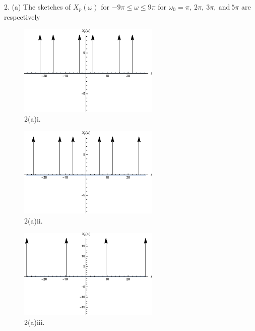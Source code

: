 \documentclass[a4paper]{article}
\begin{document}
2. (a) The sketches of $X_p(\omega)$ for $-9\pi\leq\omega\leq9\pi$ for $\omega_0=\pi,\ 2\pi,\ 3\pi,\ \text{and}\ 5\pi$ are respectively
\begin{figure}[H]
    \begin{center}
        \includegraphics[width=0.6\textwidth]{2(a)i.eps}
    \end{center}
    \caption{2(a)i.}
\end{figure}
\begin{figure}[H]
    \begin{center}
        \includegraphics[width=0.6\textwidth]{2(a)ii.eps}
    \end{center}
    \caption{2(a)ii.}
\end{figure}
\begin{figure}[H]
    \begin{center}
        \includegraphics[width=0.6\textwidth]{2(a)iii.eps}
    \end{center}
    \caption{2(a)iii.}
\end{figure}
\end{document}
